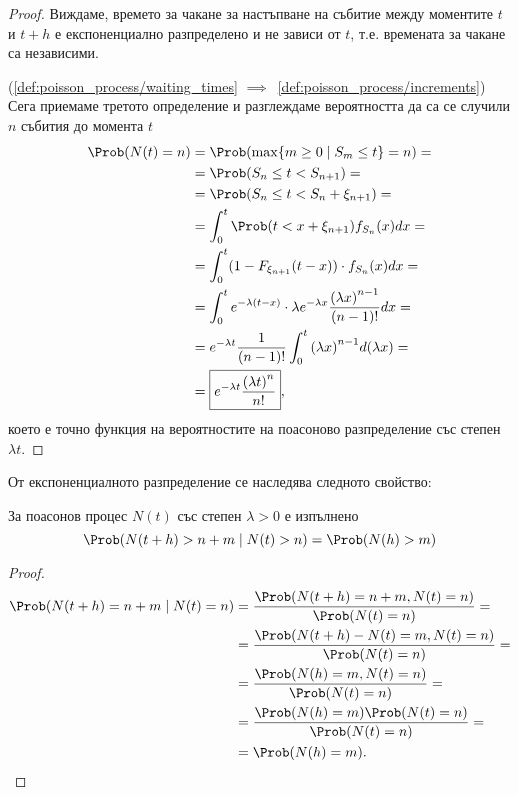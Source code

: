 \documentclass[numbers=endperiod, bibliography=totocnumbered]{scrartcl}
\begin{document}
\begin{proof}
  Виждаме, времето за чакане за настъпване на събитие между моментите \( t \) и \( t+h \) е експоненциално разпределено и не зависи от \( t \), т.е. времената за чакане са независими.

  (\ref{def:poisson_process/waiting_times} \( \implies \)~\ref{def:poisson_process/increments}) Сега приемаме третото определение и разглеждаме вероятността да са се случили \( n \) събития до момента \( t \)
  \begin{align*}
    \Prob(N(t) = n)
    &=
    \Prob(\max \{ m \geq 0 \mid S_m \leq t \} = n)
    = \\ &=
    \Prob(S_n \leq t < S_{n+1})
    = \\ &=
    \Prob(S_n \leq t < S_n + \xi_{n+1})
    = \\ &=
    \int_0^t \Prob(t < x + \xi_{n+1}) f_{S_n} (x) dx
    = \\ &=
    \int_0^t (1 - F_{\xi_{n+1}} (t - x)) \cdot f_{S_n} (x) dx
    = \\ &=
    \int_0^t e^{-\lambda (t-x)} \cdot \lambda e^{-\lambda x} \frac {{(\lambda x)}^{n-1}} {(n-1)!} dx
    = \\ &=
    e^{-\lambda t} \frac 1 {(n-1)!} \int_0^t {(\lambda x)}^{n-1} d(\lambda x)
    = \\ &=
    \boxed{e^{-\lambda t} \frac {{(\lambda t)}^n} {n!}},
  \end{align*}
  което е точно функция на вероятностите на поасоново разпределение със степен \( \lambda t \).
\end{proof}

От експоненциалното разпределение се наследява следното свойство:
\begin{proposition}
  За поасонов процес \( N(t) \) със степен \( \lambda > 0 \) е изпълнено
  \begin{equation*}
    \Prob(N(t+h) > n + m \mid N(t) > n)
    =
    \Prob(N(h) > m)
  \end{equation*}
\end{proposition}
\begin{proof}
  \begin{align*}
    \Prob(N(t+h) = n + m \mid N(t) = n)
    &=
    \frac {\Prob(N(t+h) = n + m, N(t) = n)} {\Prob(N(t) = n)}
    = \\ &=
    \frac {\Prob(N(t+h) - N(t) = m, N(t) = n)} {\Prob(N(t) = n)}
    = \\ &=
    \frac {\Prob(N(h) = m, N(t) = n)} {\Prob(N(t) = n)}
    = \\ &=
    \frac {\Prob(N(h) = m) \Prob(N(t) = n)} {\Prob(N(t) = n)}
    = \\ &=
    \Prob(N(h) = m).
  \end{align*}
\end{proof}
\end{document}
